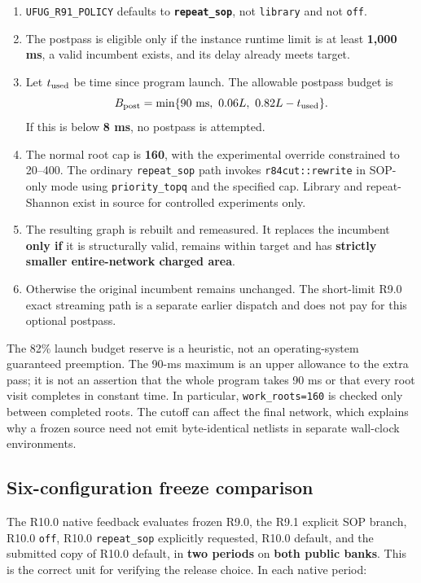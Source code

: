 \begin{enumerate}
\def\labelenumi{\arabic{enumi}.}
\tightlist
\item
  \texttt{UFUG\_R91\_POLICY} defaults to \textbf{\texttt{repeat\_sop}}, not \texttt{library} and not \texttt{off}.
\item
  The postpass is eligible only if the instance runtime limit is at least \textbf{1,000 ms}, a valid incumbent exists, and its delay already meets target.
\item
  Let \(t_{\rm used}\) be time since program launch. The allowable postpass budget is \[
  B_{\rm post}=\min\{90\text{ ms},\ 0.06L,\ 0.82L-t_{\rm used}\}.
  \] If this is below \textbf{8 ms}, no postpass is attempted.
\item
  The normal root cap is \textbf{160}, with the experimental override constrained to 20--400. The ordinary \texttt{repeat\_sop} path invokes \texttt{r84cut::rewrite} in SOP-only mode using \texttt{priority\_topq} and the specified cap. Library and repeat-Shannon exist in source for controlled experiments only.
\item
  The resulting graph is rebuilt and remeasured. It replaces the incumbent \textbf{only if} it is structurally valid, remains within target and has \textbf{strictly smaller entire-network charged area}.
\item
  Otherwise the original incumbent remains unchanged. The short-limit R9.0 exact streaming path is a separate earlier dispatch and does not pay for this optional postpass.
\end{enumerate}

The 82\% launch budget reserve is a heuristic, not an operating-system guaranteed preemption. The 90-ms maximum is an upper allowance to the extra pass; it is not an assertion that the whole program takes 90 ms or that every root visit completes in constant time. In particular, \texttt{work\_roots=160} is checked only between completed roots. The cutoff can affect the final network, which explains why a frozen source need not emit byte-identical netlists in separate wall-clock environments.

\subsection{Six-configuration freeze comparison}\label{six-configuration-freeze-comparison}

The R10.0 native feedback evaluates frozen R9.0, the R9.1 explicit SOP branch, R10.0 \texttt{off}, R10.0 \texttt{repeat\_sop} explicitly requested, R10.0 default, and the submitted copy of R10.0 default, in \textbf{two periods} on \textbf{both public banks}. This is the correct unit for verifying the release choice. In each native period:

